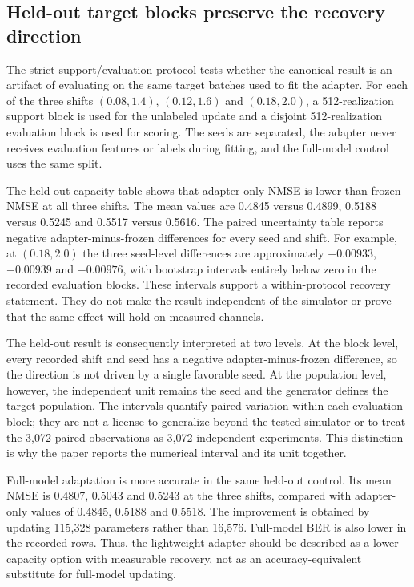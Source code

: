 \documentclass[10pt,twocolumn]{article}
\begin{document}


\subsection{Held-out target blocks preserve the recovery direction}

The strict support/evaluation protocol tests whether the canonical result is an artifact of evaluating on the same target batches used to fit the adapter. For each of the three shifts $(0.08,1.4)$, $(0.12,1.6)$ and $(0.18,2.0)$, a 512-realization support block is used for the unlabeled update and a disjoint 512-realization evaluation block is used for scoring. The seeds are separated, the adapter never receives evaluation features or labels during fitting, and the full-model control uses the same split.

The held-out capacity table shows that adapter-only NMSE is lower than frozen NMSE at all three shifts. The mean values are 0.4845 versus 0.4899, 0.5188 versus 0.5245 and 0.5517 versus 0.5616. The paired uncertainty table reports negative adapter-minus-frozen differences for every seed and shift. For example, at $(0.18,2.0)$ the three seed-level differences are approximately $-0.00933$, $-0.00939$ and $-0.00976$, with bootstrap intervals entirely below zero in the recorded evaluation blocks. These intervals support a within-protocol recovery statement. They do not make the result independent of the simulator or prove that the same effect will hold on measured channels.

The held-out result is consequently interpreted at two levels. At the block level, every recorded shift and seed has a negative adapter-minus-frozen difference, so the direction is not driven by a single favorable seed. At the population level, however, the independent unit remains the seed and the generator defines the target population. The intervals quantify paired variation within each evaluation block; they are not a license to generalize beyond the tested simulator or to treat the 3,072 paired observations as 3,072 independent experiments. This distinction is why the paper reports the numerical interval and its unit together.

Full-model adaptation is more accurate in the same held-out control. Its mean NMSE is 0.4807, 0.5043 and 0.5243 at the three shifts, compared with adapter-only values of 0.4845, 0.5188 and 0.5518. The improvement is obtained by updating 115,328 parameters rather than 16,576. Full-model BER is also lower in the recorded rows. Thus, the lightweight adapter should be described as a lower-capacity option with measurable recovery, not as an accuracy-equivalent substitute for full-model updating.
\end{document}
